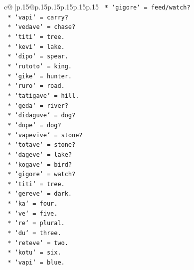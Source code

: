 \documentclass{article}
\begin{document}
{\begin{supertabular}{c@{$\;$}|p{.15\linewidth}@{}p{.15\linewidth}p{.15\linewidth}p{.15\linewidth}p{.15\linewidth}p{.15\linewidth}}
{{{\texttt{                        *   `gigore` = feed/watch?} \\
\texttt{                        *   `vapi` = carry?} \\
\texttt{                        *   `vedave` = chase?} \\
\texttt{                        *   `titi` = tree.} \\
\texttt{                        *   `kevi` = lake.} \\
\texttt{                        *   `dipo` = spear.} \\
\texttt{                        *   `rutoto` = king.} \\
\texttt{                        *   `gike` = hunter.} \\
\texttt{                        *   `ruro` = road.} \\
\texttt{                        *   `tatigave` = hill.} \\
\texttt{                        *   `geda` = river?} \\
\texttt{                        *   `didaguve` = dog?} \\
\texttt{                        *   `dope` = dog?} \\
\texttt{                        *   `vapevive` = stone?} \\
\texttt{                        *   `totave` = stone?} \\
\texttt{                        *   `dageve` = lake?} \\
\texttt{                        *   `kogave` = bird?} \\
\texttt{                        *   `gigore` = watch?} \\
\texttt{                        *   `titi` = tree.} \\
\texttt{                        *   `gereve` = dark.} \\
\texttt{                        *   `ka` = four.} \\
\texttt{                        *   `ve` = five.} \\
\texttt{                        *   `re` = plural.} \\
\texttt{                        *   `du` = three.} \\
\texttt{                        *   `reteve` = two.} \\
\texttt{                        *   `kotu` = six.} \\
\texttt{                        *   `vapi` = blue.} \\
}}}
\end{supertabular}}
\end{document}

